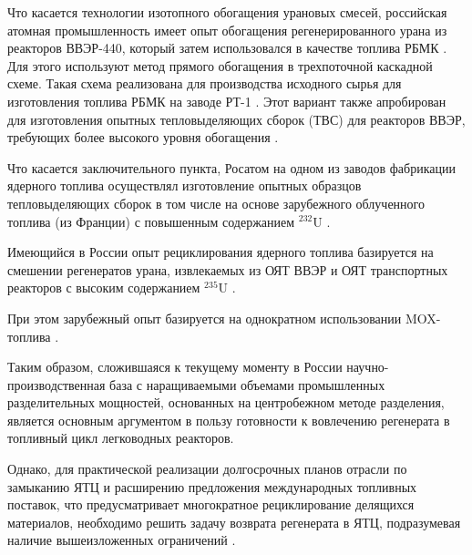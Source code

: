 Что касается технологии изотопного обогащения урановых смесей, российская атомная промышленность имеет опыт обогащения регенерированного урана из реакторов ВВЭР-440, который затем использовался в качестве топлива РБМК \cite{VVER10001200Za}. Для этого используют метод прямого обогащения в трехпоточной каскадной схеме. Такая схема реализована для производства исходного сырья для изготовления топлива РБМК на заводе РТ-1 \cite{volkVozvratUranaIz2010}. Этот вариант также апробирован для изготовления опытных тепловыделяющих сборок (ТВС) для реакторов ВВЭР, требующих более высокого уровня обогащения \cite{proselkovAnalizVozmozhnostiIspolzovaniya2003}.

Что касается заключительного пункта, Росатом на одном из заводов фабрикации ядерного топлива осуществлял изготовление опытных образцов тепловыделяющих сборок в том числе на основе зарубежного облученного топлива (из Франции) с повышенным содержанием $^{232}$U \cite{kislovRadiacionnyeAspektyIspolzovaniya}.

Имеющийся в России опыт рециклирования ядерного топлива базируется на смешении регенератов урана, извлекаемых из ОЯТ ВВЭР и ОЯТ транспортных реакторов с высоким содержанием $^{235}$U \cite{international2003iaea}.

При этом зарубежный опыт базируется на однократном использовании MOX-топлива \cite{international2003iaea}.


Таким образом, сложившаяся к текущему моменту в России научно-производственная база с наращиваемыми объемами промышленных разделительных мощностей, основанных на центробежном методе разделения, является основным аргументом в пользу готовности к вовлечению регенерата в топливный цикл легководных реакторов.

Однако, для практической реализации долгосрочных планов отрасли по замыканию ЯТЦ и расширению предложения международных топливных поставок, что предусматривает многократное рециклирование делящихся материалов, необходимо решить задачу возврата регенерата в ЯТЦ, подразумевая наличие вышеизложенных ограничений \cite{RosatomGoskorporaciyaRosatoma,panteleyOsobennostiMezhdunarodnogoSotrudnichestva2017}.

